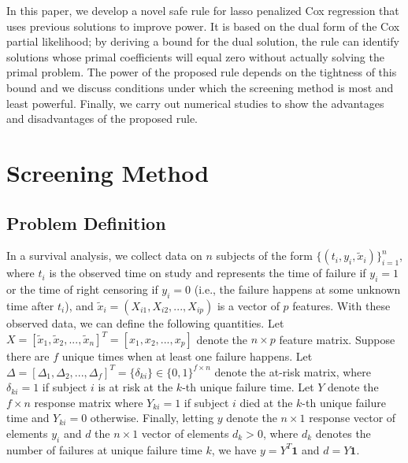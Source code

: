 In this paper, we develop a novel safe rule for lasso penalized Cox regression that uses previous solutions to improve power. It is based on the dual form of the Cox partial likelihood; by deriving a bound for the dual solution, the rule can identify solutions whose primal coefficients will equal zero without actually solving the primal problem. The power of the proposed rule depends on the tightness of this bound and we discuss conditions under which the screening method is most and least powerful. Finally, we carry out numerical studies to show the advantages and disadvantages of the proposed rule.

\section{Screening Method}
\subsection{Problem Definition}

In a survival analysis, we collect data on $n$ subjects of the form $\{(t_i,y_i,\tilde{x}_i)\}_{i=1}^n$, where $t_i$ is the observed time on study and represents the time of failure if $y_i=1$ or the time of right censoring if $y_i=0$ (i.e., the failure happens at some unknown time after $t_i$), and $\tilde{x}_i=(X_{i1},X_{i2},...,X_{ip})$ is a vector of $p$ features. With these observed data, we can define the following quantities. Let $X=[\tilde{x}_1,\tilde{x}_2,...,\tilde{x}_n]^T=[x_1,x_2,...,x_p]$ denote the $n\times p$ feature matrix. Suppose there are $f$ unique times when at least one failure happens. Let  $\Delta=[\Delta_1,\Delta_2,...,\Delta_f]^T=\{\delta_{ki}\}\in\{0,1\}^{f\times n}$ denote the at-risk matrix, where $\delta_{ki}=1$ if subject $i$ is at risk at the $k$-th unique failure time. Let $Y$ denote the $f\times n$ response matrix where $Y_{ki}=1$ if subject $i$ died at the $k$-th unique failure time and $Y_{ki}=0$ otherwise. Finally, letting $y$ denote the $n \times 1$ response vector of elements $y_i$ and $d$ the $n \times 1$ vector of elements $d_k>0$, where $d_k$ denotes the number of failures at unique failure time $k$, we have $y=Y^T\mathbf{1}$ and $d=Y\mathbf{1}$.

